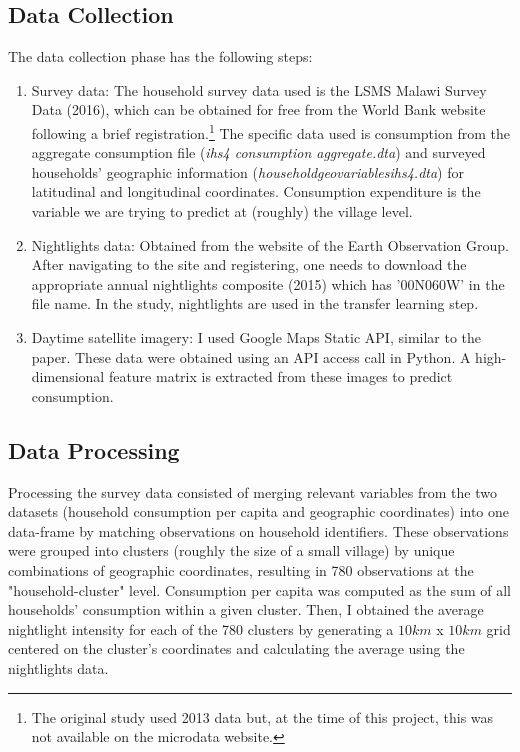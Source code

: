 \documentclass[11pt, a4paper, leqno]{article}
\begin{document}
\subsection{Data Collection}

 The data collection phase has the following steps: \vspace{-0.2cm}
\begin{enumerate}
	\item Survey data: The household survey data used is the LSMS Malawi Survey Data (2016), which can be obtained for free from the World Bank website following a brief registration.\footnote{The original study used 2013 data but, at the time of this project, this was not available on the microdata website.} The specific data used is consumption from the aggregate consumption file (\textit{ihs4 consumption aggregate.dta}) and surveyed households' geographic information (\textit{householdgeovariablesihs4.dta}) for latitudinal and longitudinal coordinates. Consumption expenditure is the variable we are trying to predict at (roughly) the village level.
	\item Nightlights data: Obtained from the website of the Earth Observation Group. After navigating to the site and registering, one needs to download the appropriate annual nightlights composite (2015) which has '00N060W' in the file name. In the study, nightlights are used in the transfer learning step.
	\item Daytime satellite imagery: I used Google Maps Static API, similar to the paper. These data were obtained using an API access call in Python. A high-dimensional feature matrix is extracted from these images to predict consumption.
\end{enumerate}

\subsection{Data Processing}

 Processing the survey data consisted of merging relevant variables from the two datasets (household consumption per capita and geographic coordinates) into one data-frame by matching observations on household identifiers. These observations were grouped into clusters (roughly the size of a small village) by unique combinations of geographic coordinates, resulting in 780 observations at the "household-cluster" level. Consumption per capita was computed as the sum of all households' consumption within a given cluster. Then, I obtained the average nightlight intensity for each of the 780 clusters by generating a $10 km$ x $10 km$ grid centered on the cluster's coordinates and calculating the average using the nightlights data. 
\end{document}
